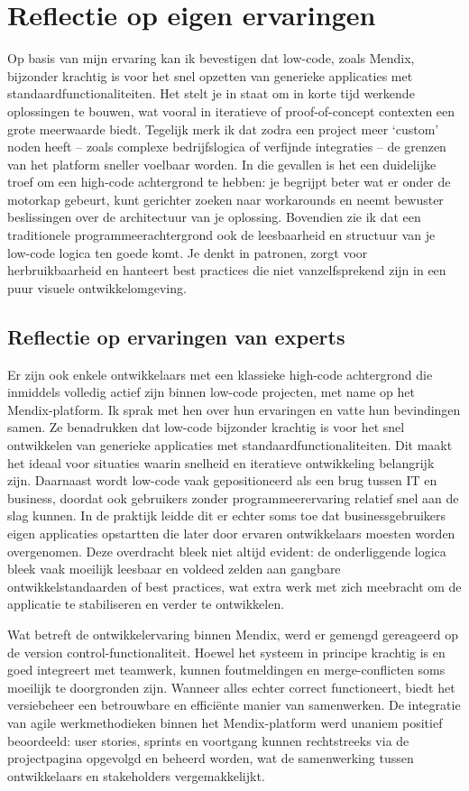 \section{Reflectie op eigen ervaringen}
Op basis van mijn ervaring kan ik bevestigen dat low-code, zoals Mendix, bijzonder krachtig is voor het snel opzetten van generieke applicaties met standaardfunctionaliteiten. Het stelt je in staat om in korte tijd werkende oplossingen te bouwen, wat vooral in iteratieve of proof-of-concept contexten een grote meerwaarde biedt. Tegelijk merk ik dat zodra een project meer ‘custom’ noden heeft – zoals complexe bedrijfslogica of verfijnde integraties – de grenzen van het platform sneller voelbaar worden. In die gevallen is het een duidelijke troef om een high-code achtergrond te hebben: je begrijpt beter wat er onder de motorkap gebeurt, kunt gerichter zoeken naar workarounds en neemt bewuster beslissingen over de architectuur van je oplossing. Bovendien zie ik dat een traditionele programmeerachtergrond ook de leesbaarheid en structuur van je low-code logica ten goede komt. Je denkt in patronen, zorgt voor herbruikbaarheid en hanteert best practices die niet vanzelfsprekend zijn in een puur visuele ontwikkelomgeving.

\subsection{Reflectie op ervaringen van experts}
Er zijn ook enkele ontwikkelaars met een klassieke high-code achtergrond die inmiddels volledig actief zijn binnen low-code projecten, met name op het Mendix-platform. Ik sprak met hen over hun ervaringen en vatte hun bevindingen samen. 
Ze benadrukken dat low-code bijzonder krachtig is voor het snel ontwikkelen van generieke applicaties met standaardfunctionaliteiten. Dit maakt het ideaal voor situaties waarin snelheid en iteratieve ontwikkeling belangrijk zijn. Daarnaast wordt low-code vaak gepositioneerd als een brug tussen IT en business, doordat ook gebruikers zonder programmeerervaring relatief snel aan de slag kunnen. In de praktijk leidde dit er echter soms toe dat businessgebruikers eigen applicaties opstartten die later door ervaren ontwikkelaars moesten worden overgenomen. Deze overdracht bleek niet altijd evident: de onderliggende logica bleek vaak moeilijk leesbaar en voldeed zelden aan gangbare ontwikkelstandaarden of best practices, wat extra werk met zich meebracht om de applicatie te stabiliseren en verder te ontwikkelen.

Wat betreft de ontwikkelervaring binnen Mendix, werd er gemengd gereageerd op de version control-functionaliteit. Hoewel het systeem in principe krachtig is en goed integreert met teamwerk, kunnen foutmeldingen en merge-conflicten soms moeilijk te doorgronden zijn. Wanneer alles echter correct functioneert, biedt het versiebeheer een betrouwbare en efficiënte manier van samenwerken. De integratie van agile werkmethodieken binnen het Mendix-platform werd unaniem positief beoordeeld: user stories, sprints en voortgang kunnen rechtstreeks via de projectpagina opgevolgd en beheerd worden, wat de samenwerking tussen ontwikkelaars en stakeholders vergemakkelijkt.


